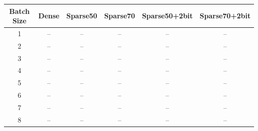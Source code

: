 \begin{tabular}{cccccc}
    \toprule
    Batch Size & Dense & Sparse50 & Sparse70 & Sparse50+2bit & Sparse70+2bit \\
    \midrule
    1 & -- & -- & -- & -- & -- \\
    2 & -- & -- & -- & -- & -- \\
    3 & -- & -- & -- & -- & -- \\
    4 & -- & -- & -- & -- & -- \\
    5 & -- & -- & -- & -- & -- \\
    6 & -- & -- & -- & -- & -- \\
    7 & -- & -- & -- & -- & -- \\
    8 & -- & -- & -- & -- & -- \\
    \bottomrule
\end{tabular}
